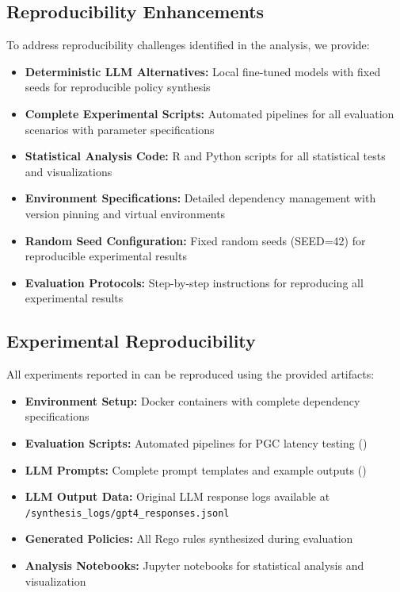\documentclass[sigconf,natbib]{acmart}
\begin{document}
\subsection{Reproducibility Enhancements}
To address reproducibility challenges identified in the analysis, we provide:

\begin{itemize}
    \item \textbf{Deterministic LLM Alternatives:} Local fine-tuned models with fixed seeds for reproducible policy synthesis
    \item \textbf{Complete Experimental Scripts:} Automated pipelines for all evaluation scenarios with parameter specifications
    \item \textbf{Statistical Analysis Code:} R and Python scripts for all statistical tests and visualizations
    \item \textbf{Environment Specifications:} Detailed dependency management with version pinning and virtual environments
    \item \textbf{Random Seed Configuration:} Fixed random seeds (SEED=42) for reproducible experimental results
    \item \textbf{Evaluation Protocols:} Step-by-step instructions for reproducing all experimental results
\end{itemize}

\subsection{Experimental Reproducibility}
All experiments reported in  can be reproduced using the provided artifacts:
\begin{itemize}
    \item \textbf{Environment Setup:} Docker containers with complete dependency specifications
    \item \textbf{Evaluation Scripts:} Automated pipelines for PGC latency testing ()
    \item \textbf{LLM Prompts:} Complete prompt templates and example outputs ()
    \item \textbf{LLM Output Data:} Original LLM response logs available at \texttt{/synthesis\_logs/gpt4\_responses.jsonl}
    \item \textbf{Generated Policies:} All Rego rules synthesized during evaluation
    \item \textbf{Analysis Notebooks:} Jupyter notebooks for statistical analysis and visualization
\end{itemize}
\end{document}
